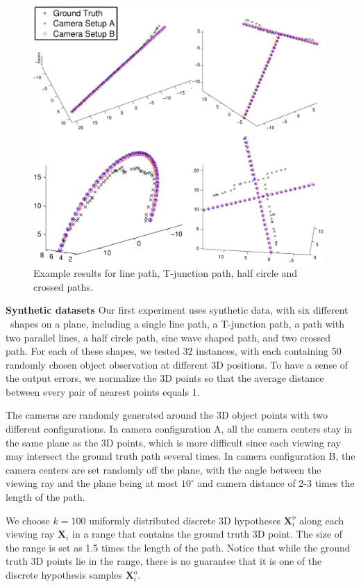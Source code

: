 \begin{figure}
\centering
    \includegraphics[width=0.99\textwidth]{chapter4/resource/allfig_2.pdf}
\caption[Example output of JOST on synthetic data]{Example results for line path, T-junction path, half circle and crossed paths.}
\label{fig:synthetic}
\end{figure}

\textbf{Synthetic datasets} Our first experiment uses synthetic data, with six different \oct~shapes on a plane, including a single line path, a T-junction path, a path with two parallel lines, a half circle path, sine wave shaped path, and two crossed path. For each of these shapes, we tested 32 instances, with each containing 50 randomly chosen object observation at different 3D positions. To have a sense of the output errors, we normalize the 3D points so that the average distance between every pair of nearest points equals 1. 

The cameras are randomly generated around the 3D object points with two different configurations. In camera configuration A, all the camera centers stay in the same plane as the 3D points, which is more difficult since each viewing ray may intersect the ground truth path several times. In camera configuration B, the camera centers are set randomly off the plane, with the angle between the viewing ray and the plane being at most $10^\circ$ and camera distance of 2-3 times the length of the path. 

We choose $k=100$ uniformly distributed discrete 3D hypotheses $\mathbf{X}_i^o$  along each viewing ray $\mathbf{X}_i$ in a range that contains the ground truth 3D point. The size of the range is set as 1.5 times the length of the path. Notice that while the ground truth 3D points lie in the range, there is no guarantee that it is one of the discrete hypothesis samples $\mathbf{X}_i^o$. %

